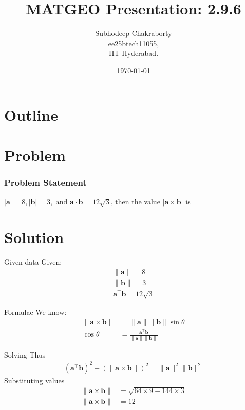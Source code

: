 \documentclass{beamer}
\title{MATGEO Presentation: 2.9.6}
\author{Subhodeep Chakraborty \\ ee25btech11055,\\IIT Hyderabad.}
\date{\today}
\providecommand{\brak}[1]{\ensuremath{\left(#1\right)}}
\theoremstyle{remark}
\providecommand{\norm}[1]{\lVert#1\rVert}
\let\vec\mathbf
\numberwithin{equation}{section}
\begin{document}
\begin{frame}
\titlepage
\end{frame}

\section*{Outline}
\begin{frame}
\tableofcontents
\end{frame}

\section{Problem}
\begin{frame}
\frametitle{Problem Statement}

$|\vec{a}| = 8, |\vec{b}| = 3, \text{ and } \vec{a}\cdot\vec{b} = 12\sqrt{3}$, then the value $|\vec{a}\times\vec{b}|$ is

\end{frame}

\section{Solution}
\begin{frame}{Given data}
Given:
\begin{align}
 \norm{\vec{a}} = 8 \\
 \norm{\vec{b}} = 3 \\
 \vec{a}^\top\vec{b} = 12\sqrt{3}
\end{align}
\end{frame}

\begin{frame}{Formulae}
We know:
\begin{align}
 \norm{\vec{a}\times\vec{b}} &= \norm{\vec{a}}\norm{\vec{b}}\sin\theta \\
 \cos\theta &= \frac{\vec{a}^\top\vec{b}}{\norm{\vec{a}}\norm{\vec{b}}}
\end{align}
\end{frame}

\begin{frame}{Solving}
Thus
\begin{align}
 \brak{\vec{a}^\top\vec{b}}^2 + \brak{\norm{\vec{a}\times\vec{b}}}^2 = \norm{\vec{a}}^2\norm{\vec{b}}^2
\end{align}
Substituting values
\begin{align}
\norm{\vec{a}\times\vec{b}} &= \sqrt{64\times9-144\times3} \\
\norm{\vec{a}\times\vec{b}} &= 12
\end{align}
\end{frame}
\end{document}
